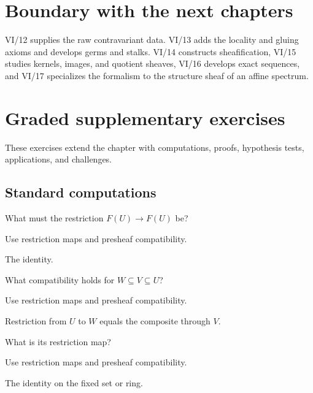 \section{Boundary with the next chapters}

VI/12 supplies the raw contravariant data.  VI/13 adds the locality and gluing axioms and
develops germs and stalks.  VI/14 constructs sheafification, VI/15 studies kernels, images,
and quotient sheaves, VI/16 develops exact sequences, and VI/17 specializes the formalism to
the structure sheaf of an affine spectrum.
\section{Graded supplementary exercises}
These exercises extend the chapter with computations, proofs, hypothesis tests, applications, and challenges.

\subsection*{Standard computations}

\begin{exercise}\label{exr:vi12-expand-01}
What must the restriction $F(U)\to F(U)$ be?
\end{exercise}
\begin{hint}
Use restriction maps and presheaf compatibility.
\end{hint}
\begin{solution}
The identity.
\end{solution}

\begin{exercise}[Composition]\label{exr:vi12-expand-02}
What compatibility holds for $W\subseteq V\subseteq U$?
\end{exercise}
\begin{hint}
Use restriction maps and presheaf compatibility.
\end{hint}
\begin{solution}
Restriction from $U$ to $W$ equals the composite through $V$.
\end{solution}

\begin{exercise}\label{exr:vi12-expand-03}
What is its restriction map?
\end{exercise}
\begin{hint}
Use restriction maps and presheaf compatibility.
\end{hint}
\begin{solution}
The identity on the fixed set or ring.
\end{solution}

